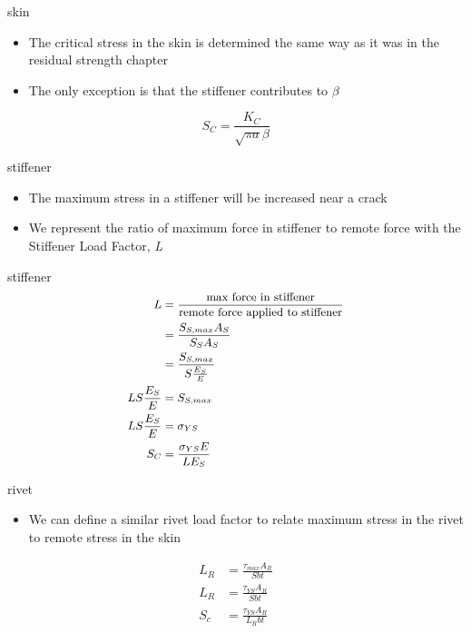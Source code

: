\documentclass[
  letterpaper,
  ignorenonframetext,
  aspectratio=43,
  handout,
  12pt]{beamer}
\providecommand{\tightlist}{%
  \setlength{\itemsep}{0pt}\setlength{\parskip}{0pt}}
\providecommand{\tightlist}{%
\setlength{\itemsep}{0pt}\setlength{\parskip}{0pt}}
\begin{document}
\begin{frame}{skin}
\protect\hypertarget{skin}{}
\begin{itemize}
\tightlist
\item
  The critical stress in the skin is determined the same way as it was
  in the residual strength chapter
\item
  The only exception is that the stiffener contributes to \(\beta\)
\end{itemize}

\[S_C = \frac{K_C}{\sqrt{\pi a} \beta}\]
\end{frame}

\begin{frame}{stiffener}
\protect\hypertarget{stiffener}{}
\begin{itemize}
\tightlist
\item
  The maximum stress in a stiffener will be increased near a crack
\item
  We represent the ratio of maximum force in stiffener to remote force
  with the Stiffener Load Factor, \emph{L}
\end{itemize}
\end{frame}

\begin{frame}{stiffener}
\protect\hypertarget{stiffener-1}{}
\[\small{\begin{aligned}
  L &= \frac{\text{max force in stiffener}}{\text{remote force applied to stiffener}}\\
  &= \frac{S_{S,max}A_S}{S_S A_S}\\
  &= \frac{S_{S,max}}{S \frac{E_S}{E}}\\
  L S \frac{E_S}{E} &= S_{S,max}\\
  L S \frac{E_S}{E} &= \sigma_{YS}\\
  S_C &= \frac{\sigma_{YS} E}{L E_S}
\end{aligned}}\]
\end{frame}

\begin{frame}{rivet}
\protect\hypertarget{rivet}{}
\begin{itemize}
\tightlist
\item
  We can define a similar rivet load factor to relate maximum stress in
  the rivet to remote stress in the skin
\end{itemize}

\[\begin{aligned}
  L_R &= \frac{\tau_{max} A_R}{S b t}\\
  L_R &= \frac{\tau_{YS} A_R}{S b t}\\
  S_c &= \frac{\tau_{YS} A_R}{L_R b t}
\end{aligned}\]
\end{frame}
\end{document}
